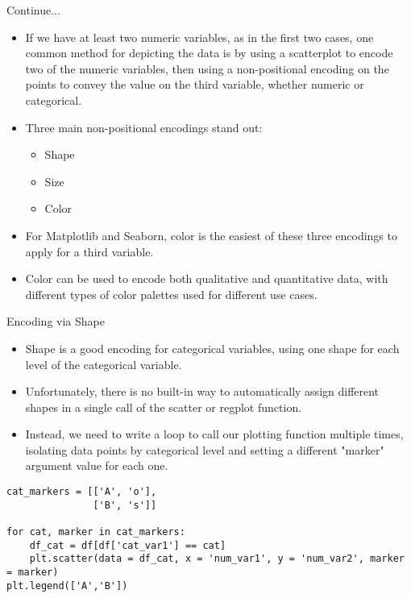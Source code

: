 \documentclass[12pt]{beamer}
\begin{document}
    \begin{frame}{Continue...}
    	\begin{itemize}
    		\item If we have at least two numeric variables, as in the first two cases, one common method for depicting the data is by using a scatterplot to encode two of the numeric variables, then using a non-positional encoding on the points to convey the value on the third variable, whether numeric or categorical. 
    		\item Three main non-positional encodings stand out:
    		
    		\begin{itemize}
    			\item Shape
    			\item Size
    			\item Color
    		\end{itemize}
    		\item For Matplotlib and Seaborn, color is the easiest of these three encodings to apply for a third variable.
    		\item Color can be used to encode both qualitative and quantitative data, with different types of color palettes used for different use cases.
    	\end{itemize}
    \end{frame}
    \begin{frame}[fragile]{Encoding via Shape}
    	\begin{itemize}
    		\item Shape is a good encoding for categorical variables, using one shape for each level of the categorical variable.
    		\item Unfortunately, there is no built-in way to automatically assign different shapes in a single call of the scatter or regplot function.
    		\item Instead, we need to write a loop to call our plotting function multiple times, isolating data points by categorical level and setting a different "marker" argument value for each one.
    	\end{itemize}
    \vspace{0.4cm}
    \fontsize{8}{0.5}
        \begin{verbatim}
cat_markers = [['A', 'o'],
               ['B', 's']]

for cat, marker in cat_markers:
    df_cat = df[df['cat_var1'] == cat]
    plt.scatter(data = df_cat, x = 'num_var1', y = 'num_var2', marker = marker)
plt.legend(['A','B'])
        \end{verbatim}
    \end{frame}
\end{document}
